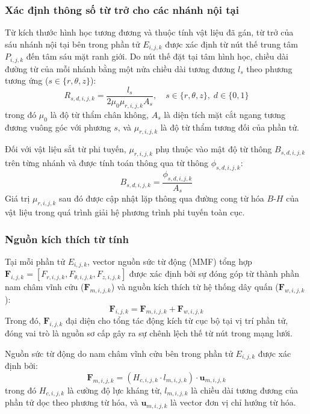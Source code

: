 \subsubsection{Xác định thông số từ trở cho các nhánh nội tại}
Từ kích thước hình học tương đương và thuộc tính vật liệu đã gán, từ trở của sáu nhánh nội tại bên trong phần tử $E_{i,j,k}$ được xác định từ nút thế trung tâm $P_{i,j,k}$ đến tâm sáu mặt ranh giới. Do nút thế đặt tại tâm hình học, chiều dài đường từ của mỗi nhánh bằng một nửa chiều dài tương đương $l_s$ theo phương tương ứng ($s \in \{r, \theta, z\}$):
\begin{equation}
    R_{s,d,i,j,k} = \frac{l_s}{2 \mu_0 \mu_{r,i,j,k} A_s}, \quad s \in \{r, \theta, z\}, \; d \in \{0, 1\}
\end{equation}
trong đó $\mu_0$ là độ từ thẩm chân không, $A_s$ là diện tích mặt cắt ngang tương đương vuông góc với phương $s$, và $\mu_{r,i,j,k}$ là độ từ thẩm tương đối của phần tử.

Đối với vật liệu sắt từ phi tuyến, $\mu_{r,i,j,k}$ phụ thuộc vào mật độ từ thông $B_{s,d,i,j,k}$ trên từng nhánh và được tính toán thông qua từ thông $\phi_{s,d,i,j,k}$:
\begin{equation}
    B_{s,d,i,j,k} = \frac{\phi_{s,d,i,j,k}}{A_s}
\end{equation}
Giá trị $\mu_{r,i,j,k}$ sau đó được cập nhật lặp thông qua đường cong từ hóa $B\text{-}H$ của vật liệu trong quá trình giải hệ phương trình phi tuyến toàn cục.

\subsubsection{Nguồn kích thích từ tính}
Tại mỗi phần tử $E_{i,j,k}$, vector nguồn sức từ động (MMF) tổng hợp $\mathbf{F}_{i,j,k} = [F_{r,i,j,k}, F_{\theta,i,j,k}, F_{z,i,j,k}]$ được xác định bởi sự đóng góp từ thành phần nam châm vĩnh cửu ($\mathbf{F}_{m,i,j,k}$) và nguồn kích thích từ hệ thống dây quấn ($\mathbf{F}_{w,i,j,k}$):
\begin{equation}
    \mathbf{F}_{i,j,k} = \mathbf{F}_{m,i,j,k} + \mathbf{F}_{w,i,j,k}
\end{equation}
Trong đó, $\mathbf{F}_{i,j,k}$ đại diện cho tổng tác động kích từ cục bộ tại vị trí phần tử, đóng vai trò là nguồn sơ cấp gây ra sự chênh lệch thế từ nút trong mạng lưới.

Nguồn sức từ động do nam châm vĩnh cửu bên trong phần tử $E_{i,j,k}$ được xác định bởi:
\begin{equation}
    \mathbf{F}_{m,i,j,k} = (H_{c,i,j,k} \cdot l_{m,i,j,k}) \cdot \mathbf{u}_{m,i,j,k}
\end{equation}
trong đó $H_{c,i,j,k}$ là cường độ lực kháng từ, $l_{m,i,j,k}$ là chiều dài tương đương của phần tử dọc theo phương từ hóa, và $\mathbf{u}_{m,i,j,k}$ là vector đơn vị chỉ hướng từ hóa.

